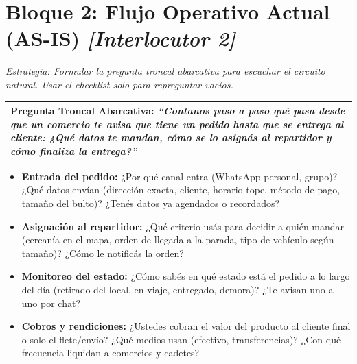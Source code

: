 \documentclass[11pt,a4paper]{article}
\begin{document}
\section*{Bloque 2: Flujo Operativo Actual (AS-IS) \hfill \normalfont\small\itshape [Interlocutor 2]}
\noindent
\textit{\small Estrategia: Formular la pregunta troncal abarcativa para escuchar el circuito natural. Usar el checklist solo para repreguntar vacíos.}

\vspace{3pt}
\noindent
\begin{tabularx}{\textwidth}{|X|}
\hline
\textbf{Pregunta Troncal Abarcativa:}
\textit{``Contanos paso a paso qué pasa desde que un comercio te avisa que tiene un pedido hasta que se entrega al cliente: ¿Qué datos te mandan, cómo se lo asignás al repartidor y cómo finaliza la entrega?''} \\
\hline
\end{tabularx}

\begin{itemize}[label=$\diamond$]
  \item \textbf{Entrada del pedido:} ¿Por qué canal entra (WhatsApp personal, grupo)? ¿Qué datos envían (dirección exacta, cliente, horario tope, método de pago, tamaño del bulto)? ¿Tenés datos ya agendados o recordados?
  \item \textbf{Asignación al repartidor:} ¿Qué criterio usás para decidir a quién mandar (cercanía en el mapa, orden de llegada a la parada, tipo de vehículo según tamaño)? ¿Cómo le notificás la orden?
  \item \textbf{Monitoreo del estado:} ¿Cómo sabés en qué estado está el pedido a lo largo del día (retirado del local, en viaje, entregado, demora)? ¿Te avisan uno a uno por chat?
  \item \textbf{Cobros y rendiciones:} ¿Ustedes cobran el valor del producto al cliente final o solo el flete/envío? ¿Qué medios usan (efectivo, transferencias)? ¿Con qué frecuencia liquidan a comercios y cadetes?
\end{itemize}

\clearpage

\end{document}

